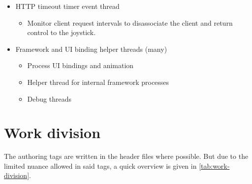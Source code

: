 \documentclass[final]{article}
\begin{document}
\begin{itemize}
 \item HTTP timeout timer event thread
 \begin{itemize}
    \item Monitor client request intervals to disassociate the client and return control to the joystick.
 \end{itemize}
 \item Framework and UI binding helper threads (many)
 \begin{itemize}
    \item Process UI bindings and animation
    \item Helper thread for internal framework processes
    \item Debug threads
 \end{itemize}
\end{itemize}
\section{Work division}
The authoring tags are written in the header files where possible.
But due to the limited nuance allowed in said tags, a quick overview is given in \cref{tab:work-division}.
\end{document}
